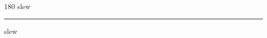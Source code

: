 
\begin{frame}
\begin{center}
\begin{turn}{180}
{\fontsize{2.5cm}{1em}\selectfont slew}
\end{turn}
\vspace{1em}\par  
\hrule
\vspace{1em}\par  
{\fontsize{2.5cm}{1em}\selectfont slew}
\end{center}
\end{frame}
